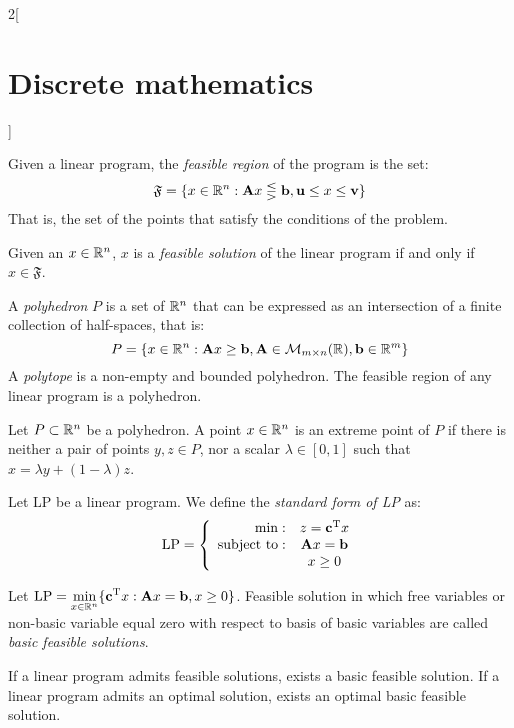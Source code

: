 \documentclass[../../../main.tex]{subfiles}
\begin{document}
\begin{multicols}{2}[\section{Discrete mathematics}]
    \begin{definition}
        Given a linear program, the \textit{feasible region} of the program is the set: $$\mathfrak{F}=\{x\in\mathbb{R} ^n:\vb{A}x\lesseqgtr \vb{b},\vb{u}\leq x\leq \vb{v}\}$$ That is, the set of the points that satisfy the conditions of the problem.
    \end{definition}
    \begin{prop}
        Given an $x\in\mathbb{R} ^n$, $x$ is a \textit{feasible solution} of the linear program if and only if $x\in\mathfrak{F}$.
    \end{prop}
    \begin{definition}
        A \textit{polyhedron} $P$ is a set of $\mathbb{R} ^n$ that can be expressed as an intersection of a finite collection of half-spaces, that is: $$P=\{x\in\mathbb{R} ^n:\vb{A}x\geq \vb{b}, \vb{A}\in\mathcal{M}_{m\times n}(\mathbb{R} ),\vb{b}\in\mathbb{R} ^m\}$$ A \textit{polytope} is a non-empty and bounded polyhedron. The feasible region of any linear program is a polyhedron.
    \end{definition}
    \begin{definition}
        Let $P\subset\mathbb{R} ^n$ be a polyhedron. A point $x\in\mathbb{R} ^n$ is an extreme point of $P$ if there is neither a pair of points $y,z\in P$, nor a scalar $\lambda\in[0,1]$ such that $x=\lambda y+(1-\lambda)z$.
    \end{definition}
    \begin{definition}
        Let LP be a linear program. We define the \textit{standard form of LP} as:
        $$\text{LP}=\left\{
            \begin{array}{rc}
                \min:              & z=\vb{c}^{\mathrm{T}}x             \\
                \text{subject to}: & \vb{A}x=\vb{b} \\
                                   & x\geq 0
            \end{array}\right.$$
    \end{definition}
    \begin{definition}
        Let $\displaystyle \text{LP}=\min_{x\in\mathbb{R} ^n}\{\vb{c}^{\mathrm{T}}x:\vb{A}x=\vb{b},x\geq 0\}$. Feasible solution in which free variables or non-basic variable equal zero with respect to basis of basic variables are called \textit{basic feasible solutions}.
    \end{definition}
    \begin{prop}
        If a linear program admits feasible solutions, exists a basic feasible solution. If a linear program admits an optimal solution, exists an optimal basic feasible solution.

\end{prop}
\end{multicols}
\end{document}
